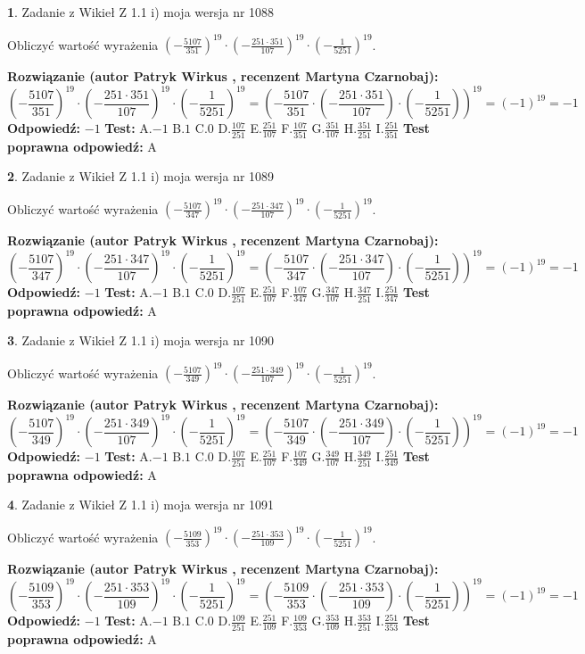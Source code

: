 \documentclass[12pt, a4paper]{article}
\theoremstyle{definition} %
\newtheorem{zad}{}
\newcommand{\zadStart}[1]{\begin{zad}#1\newline}
\newcommand{\zadStop}{\end{zad}}
\newcommand{\rozwStart}[2]{\noindent \textbf{Rozwiązanie (autor #1 , recenzent #2): }\newline}
\newcommand{\rozwStop}{\newline}
\newcommand{\odpStart}{\noindent \textbf{Odpowiedź:}\newline}
\newcommand{\odpStop}{\newline}
\newcommand{\testStart}{\noindent \textbf{Test:}\newline}
\newcommand{\testStop}{\newline}
\newcommand{\kluczStart}{\noindent \textbf{Test poprawna odpowiedź:}\newline}
\newcommand{\kluczStop}{\newline}
\begin{document}
\zadStart{Zadanie z Wikieł Z 1.1 i) moja wersja nr 1088}

Obliczyć wartość wyrażenia $(-\frac{5107}{351})^{19} \cdot (-\frac{251 \cdot 351}{107})^{19} \cdot (-\frac{1}{5251})^{19}$.
\zadStop
\rozwStart{Patryk Wirkus}{Martyna Czarnobaj}
$$(-\frac{5107}{351})^{19} \cdot (-\frac{251 \cdot 351}{107})^{19} \cdot (-\frac{1}{5251})^{19} = (-\frac{5107}{351} \cdot (-\frac{251 \cdot 351}{107}) \cdot (-\frac{1}{5251}))^{19} = (-1)^{19} = -1$$
\rozwStop
\odpStart
$-1$
\odpStop
\testStart
A.$-1$ B.$1$ C.$0$ D.$\frac{107}{251}$ E.$\frac{251}{107}$
F.$\frac{107}{351}$ G.$\frac{351}{107}$
H.$\frac{351}{251}$
I.$\frac{251}{351}$
\testStop
\kluczStart
A
\kluczStop



\zadStart{Zadanie z Wikieł Z 1.1 i) moja wersja nr 1089}

Obliczyć wartość wyrażenia $(-\frac{5107}{347})^{19} \cdot (-\frac{251 \cdot 347}{107})^{19} \cdot (-\frac{1}{5251})^{19}$.
\zadStop
\rozwStart{Patryk Wirkus}{Martyna Czarnobaj}
$$(-\frac{5107}{347})^{19} \cdot (-\frac{251 \cdot 347}{107})^{19} \cdot (-\frac{1}{5251})^{19} = (-\frac{5107}{347} \cdot (-\frac{251 \cdot 347}{107}) \cdot (-\frac{1}{5251}))^{19} = (-1)^{19} = -1$$
\rozwStop
\odpStart
$-1$
\odpStop
\testStart
A.$-1$ B.$1$ C.$0$ D.$\frac{107}{251}$ E.$\frac{251}{107}$
F.$\frac{107}{347}$ G.$\frac{347}{107}$
H.$\frac{347}{251}$
I.$\frac{251}{347}$
\testStop
\kluczStart
A
\kluczStop



\zadStart{Zadanie z Wikieł Z 1.1 i) moja wersja nr 1090}

Obliczyć wartość wyrażenia $(-\frac{5107}{349})^{19} \cdot (-\frac{251 \cdot 349}{107})^{19} \cdot (-\frac{1}{5251})^{19}$.
\zadStop
\rozwStart{Patryk Wirkus}{Martyna Czarnobaj}
$$(-\frac{5107}{349})^{19} \cdot (-\frac{251 \cdot 349}{107})^{19} \cdot (-\frac{1}{5251})^{19} = (-\frac{5107}{349} \cdot (-\frac{251 \cdot 349}{107}) \cdot (-\frac{1}{5251}))^{19} = (-1)^{19} = -1$$
\rozwStop
\odpStart
$-1$
\odpStop
\testStart
A.$-1$ B.$1$ C.$0$ D.$\frac{107}{251}$ E.$\frac{251}{107}$
F.$\frac{107}{349}$ G.$\frac{349}{107}$
H.$\frac{349}{251}$
I.$\frac{251}{349}$
\testStop
\kluczStart
A
\kluczStop



\zadStart{Zadanie z Wikieł Z 1.1 i) moja wersja nr 1091}

Obliczyć wartość wyrażenia $(-\frac{5109}{353})^{19} \cdot (-\frac{251 \cdot 353}{109})^{19} \cdot (-\frac{1}{5251})^{19}$.
\zadStop
\rozwStart{Patryk Wirkus}{Martyna Czarnobaj}
$$(-\frac{5109}{353})^{19} \cdot (-\frac{251 \cdot 353}{109})^{19} \cdot (-\frac{1}{5251})^{19} = (-\frac{5109}{353} \cdot (-\frac{251 \cdot 353}{109}) \cdot (-\frac{1}{5251}))^{19} = (-1)^{19} = -1$$
\rozwStop
\odpStart
$-1$
\odpStop
\testStart
A.$-1$ B.$1$ C.$0$ D.$\frac{109}{251}$ E.$\frac{251}{109}$
F.$\frac{109}{353}$ G.$\frac{353}{109}$
H.$\frac{353}{251}$
I.$\frac{251}{353}$
\testStop
\kluczStart
A
\kluczStop
\end{document}

